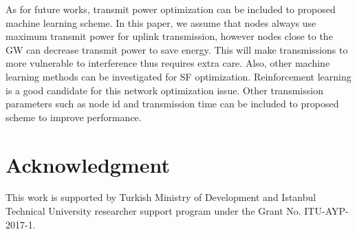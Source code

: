 \documentclass[conference]{IEEEtran}
\begin{document}
\par As for future works, transmit power optimization can be included to proposed machine learning scheme. In this paper, we assume that nodes always use maximum transmit power for uplink transmission, however nodes close to the GW can decrease transmit power to save energy. This will make transmissions to more vulnerable to interference thus requires extra care. Also, other machine learning methods can be investigated for SF optimization. Reinforcement learning is a good candidate for this network optimization issue. Other transmission parameters such as node id and transmission time can be included to proposed scheme to improve performance.


\section*{Acknowledgment}
\par This work is supported by Turkish Ministry of Development and Istanbul Technical University researcher support program under the Grant No. ITU-AYP-2017-1.




\end{document}
